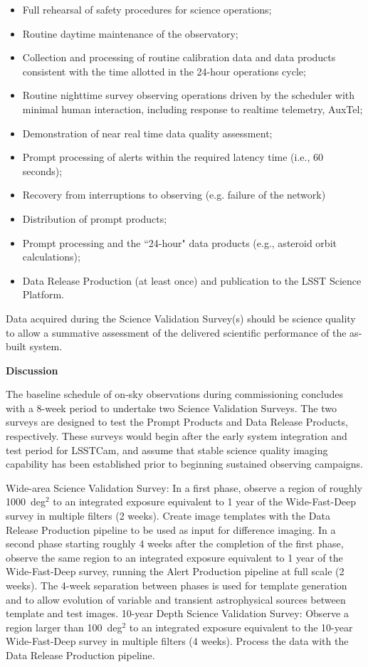 \begin{itemize}
\item Full rehearsal of safety procedures for science operations;
\item Routine daytime maintenance of the observatory;
\item Collection and processing of routine calibration data and data products consistent with the time allotted in the 24-hour operations cycle;
\item Routine nighttime survey observing operations driven by the scheduler with minimal human interaction, including response to realtime telemetry, AuxTel;
\item Demonstration of near real time data quality assessment;
\item Prompt processing of alerts within the required latency time (i.e., 60 seconds);
\item Recovery from interruptions to observing (e.g. failure of the network)
\item Distribution of prompt products;
\item Prompt processing and the ``24-hour" data products (e.g., asteroid orbit calculations);
\item Data Release Production (at least once) and publication to the LSST Science Platform.
\end{itemize}

Data acquired during the Science Validation Survey(s) should be science quality to allow a summative assessment of the delivered scientific performance of the as-built system.

\textbf{Discussion}

The baseline schedule of on-sky observations during commissioning concludes with a 8-week period to undertake two Science Validation Surveys. The two surveys are designed to test the Prompt Products and Data Release Products, respectively. These surveys would begin after the early system integration and test period for LSSTCam, and assume that stable science quality imaging capability has been established prior to beginning sustained observing campaigns.

    Wide-area Science Validation Survey: In a first phase, observe a region of roughly 1000~deg$^2$ to an integrated exposure equivalent to 1 year of the Wide-Fast-Deep survey in multiple filters (2 weeks). Create image templates with the Data Release Production pipeline to be used as input for difference imaging. In a second phase starting roughly 4 weeks after the completion of the first phase, observe the same region to an integrated exposure equivalent to 1 year of the Wide-Fast-Deep survey, running the Alert Production pipeline at full scale (2 weeks). The 4-week separation between phases is used for template generation and to allow evolution of variable and transient astrophysical sources between template and test images.
    10-year Depth Science Validation Survey: Observe a region larger than 100~deg$^2$ to an integrated exposure equivalent to the 10-year Wide-Fast-Deep survey in multiple filters (4 weeks). Process the data with the Data Release Production pipeline.

